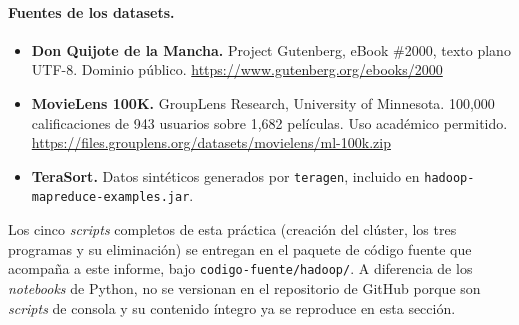 \paragraph{Fuentes de los datasets.}
\begin{itemize}[leftmargin=*]
    \item \textbf{Don Quijote de la Mancha.} Project Gutenberg, eBook \#2000, texto plano UTF-8. Dominio público. \url{https://www.gutenberg.org/ebooks/2000}
    \item \textbf{MovieLens 100K.} GroupLens Research, University of Minnesota. 100,000 calificaciones de 943 usuarios sobre 1,682 películas. Uso académico permitido. \url{https://files.grouplens.org/datasets/movielens/ml-100k.zip}
    \item \textbf{TeraSort.} Datos sintéticos generados por \texttt{teragen}, incluido en \texttt{hadoop-\bk{}mapreduce-\bk{}examples.\bk{}jar}.
\end{itemize}

Los cinco \textit{scripts} completos de esta práctica (creación del clúster, los tres programas y su eliminación) se entregan en el paquete de código fuente que acompaña a este informe, bajo \texttt{codigo-\bk{}fuente/\bk{}hadoop/}. A diferencia de los \textit{notebooks} de Python, no se versionan en el repositorio de GitHub porque son \textit{scripts} de consola y su contenido íntegro ya se reproduce en esta sección.
